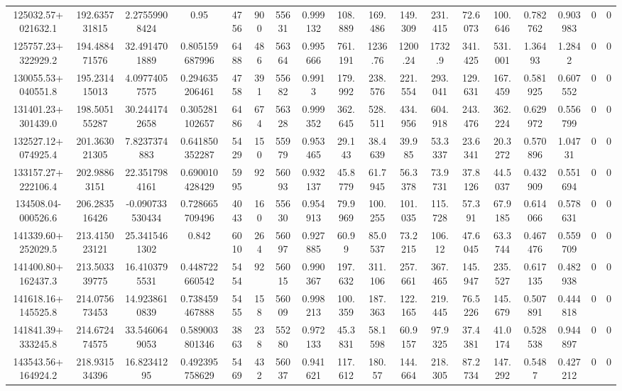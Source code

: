 \begin{table}
\begin{tabular}{cccccccccccccccccc}
125032.57+021632.1 & 192.635731815 & 2.27559908424 & 0.95 & 4756 & 900 & 55631 & 0.999132 & 108.889 & 169.486 & 149.309 & 231.415 & 72.6073 & 100.646 & 0.782762 & 0.903983 & 0 & 0 \\
125757.23+322929.2 & 194.488471576 & 32.4914701889 & 0.805159687996 & 6488 & 486 & 56364 & 0.995666 & 761.191 & 1236.76 & 1200.24 & 1732.9 & 341.425 & 531.001 & 1.36493 & 1.2842 & 0 & 0 \\
130055.53+040551.8 & 195.231415013 & 4.09774057575 & 0.294635206461 & 4758 & 391 & 55682 & 0.9913 & 179.992 & 238.576 & 221.554 & 293.041 & 129.631 & 167.459 & 0.581925 & 0.607552 & 0 & 0 \\
131401.23+301439.0 & 198.505155287 & 30.2441742658 & 0.305281102657 & 6486 & 674 & 56328 & 0.999352 & 362.645 & 528.511 & 434.956 & 604.918 & 243.476 & 362.224 & 0.629972 & 0.556799 & 0 & 0 \\
132527.12+074925.4 & 201.363021305 & 7.8237374883 & 0.641850352287 & 5429 & 150 & 55979 & 0.953465 & 29.143 & 38.4639 & 39.985 & 53.3337 & 23.6341 & 20.3272 & 0.570896 & 1.04731 & 0 & 0 \\
133157.27+222106.4 & 202.98863151 & 22.3517984161 & 0.690010428429 & 5995 & 92 & 56093 & 0.932137 & 45.8779 & 61.7945 & 56.3378 & 73.9731 & 37.8126 & 44.5037 & 0.432909 & 0.551694 & 0 & 0 \\
134508.04-000526.6 & 206.283516426 & -0.090733530434 & 0.728665709496 & 4043 & 160 & 55630 & 0.954913 & 79.9969 & 100.255 & 101.035 & 115.728 & 57.391 & 67.9185 & 0.614066 & 0.578631 & 0 & 0 \\
141339.60+252029.5 & 213.415023121 & 25.3415461302 & 0.842 & 6010 & 264 & 56097 & 0.927885 & 60.99 & 85.0537 & 73.2215 & 106.12 & 47.6045 & 63.3744 & 0.467476 & 0.559709 & 0 & 0 \\
141400.80+162437.3 & 213.503339775 & 16.4103795531 & 0.448722660542 & 5454 & 92 & 56015 & 0.990367 & 197.632 & 311.106 & 257.661 & 367.465 & 145.947 & 235.527 & 0.617135 & 0.482938 & 0 & 0 \\
141618.16+145525.8 & 214.075673453 & 14.9238610839 & 0.738459467888 & 5455 & 158 & 56009 & 0.998213 & 100.359 & 187.363 & 122.165 & 219.445 & 76.5226 & 145.679 & 0.507891 & 0.444818 & 0 & 0 \\
141841.39+333245.8 & 214.672474575 & 33.5460649053 & 0.589003801346 & 3863 & 238 & 55280 & 0.972133 & 45.3831 & 58.1598 & 60.9157 & 97.9325 & 37.4381 & 41.0174 & 0.528538 & 0.944897 & 0 & 0 \\
143543.56+164924.2 & 218.931534396 & 16.82341295 & 0.492395758629 & 5469 & 432 & 56037 & 0.941621 & 117.612 & 180.57 & 144.664 & 218.305 & 87.2734 & 147.292 & 0.5487 & 0.427212 & 0 & 0 \\

\end{tabular}
\end{table}
